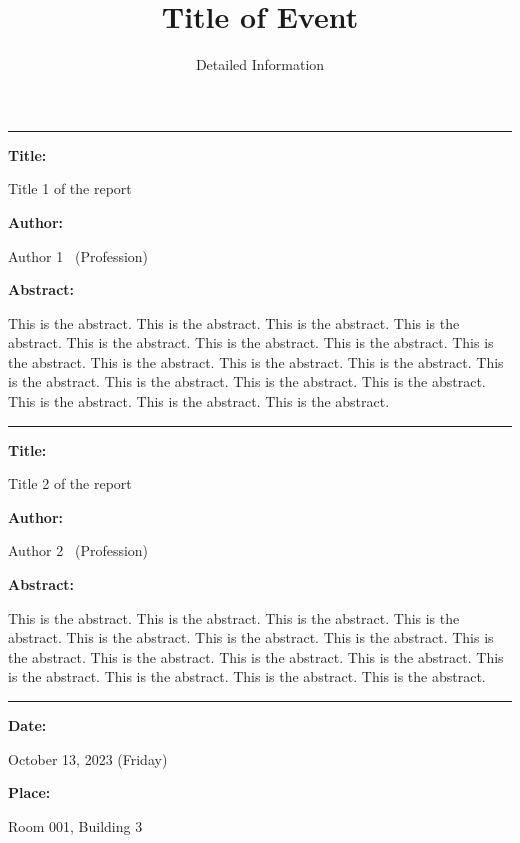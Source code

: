 \documentclass[a4paper,14pt]{extarticle}
\title{Title of Event}
\author{Detailed Information}
\newenvironment{point}[1][Reply]{%
  {\noindent\bfseries #1:}\enspace\ignorespaces%
}{%
  \par\smallskip%
}
\newenvironment{block}[1][]{%
  {\noindent\bfseries #1:}%
  \par\smallskip%
  \noindent\ignorespaces%
}{%
  \par\medskip%
}
\begin{document}
\maketitle

\hrule
\vspace{1.2em}

\begin{point}[Title]
  Title 1 of the report
\end{point}

\begin{point}[Author]
  Author 1~ (Profession)
\end{point}

\begin{point}[Abstract]
This is the abstract. This is the abstract. This is the abstract.
This is the abstract. This is the abstract. This is the abstract.
This is the abstract. This is the abstract. This is the abstract.
This is the abstract. This is the abstract. This is the abstract.
This is the abstract. This is the abstract. This is the abstract.
This is the abstract. This is the abstract. This is the abstract.
\end{point}

\bigskip
\hrule
\vspace{1.5em}

\begin{point}[Title]
  Title 2 of the report
\end{point}

\begin{point}[Author]
  Author 2~ (Profession)
\end{point}

\begin{block}[Abstract]
This is the abstract. This is the abstract. This is the abstract.
This is the abstract. This is the abstract. This is the abstract.
This is the abstract. This is the abstract. This is the abstract.
This is the abstract. This is the abstract. This is the abstract.
This is the abstract. This is the abstract. This is the abstract.
\end{block}

\bigskip
\hrule
\vspace{1.5em}

\begin{point}[Date]
  October 13, 2023 (Friday)
\end{point}

\begin{point}[Place]
  Room 001, Building 3
\end{point}
\end{document}
